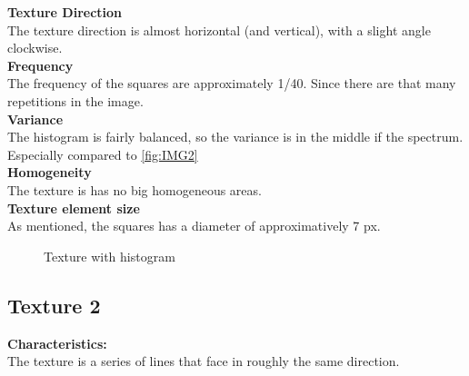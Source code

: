 \documentclass{article}
\begin{document}
\textbf{Texture Direction}\\
The texture direction is almost horizontal (and vertical), with a slight angle clockwise.\\

\textbf{Frequency} \\
The frequency of the squares are approximately 1/40. Since there are that many repetitions in the image. 
\\ 


\textbf{Variance}\\
The histogram is fairly balanced, so the variance is in the middle if the spectrum. Especially compared to \ref{fig:IMG2} \\

\textbf{Homogeneity}\\
The texture is has no big homogeneous areas.\\


\textbf{Texture element size}\\
As mentioned, the squares has a diameter of approximatively 7 px.



\begin{figure}[h]%
	\centering
    \qquad
    \caption{Texture with histogram}%
    \label{fig:IMG1}%
\end{figure}





\newpage
\subsection{Texture 2}
\textbf{Characteristics:}\\
The texture is a series of lines that face in roughly the same direction.
\\
\end{document}
